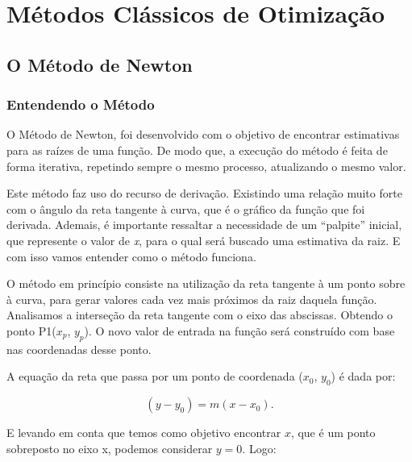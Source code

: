 
\chapter{\Large{Métodos Clássicos de Otimização}}\label{chp:2}


\section{{O Método de Newton}}


\subsection{Entendendo o Método}

\hspace{0.8cm}
O Método de Newton, foi desenvolvido com o objetivo de encontrar estimativas
para as raízes de uma função. De modo que, a execução do método é feita de
forma iterativa, repetindo sempre o mesmo processo, atualizando o mesmo valor.

Este método faz uso do recurso de derivação. Existindo uma relação muito
forte com o ângulo da reta tangente à curva, que é o gráfico da função que
foi derivada. Ademais, é importante ressaltar a necessidade de um ``palpite''
inicial, que represente o valor de \textit{x}, para o qual será buscado uma
estimativa da raiz. E com isso vamos entender como o método funciona.

O método em princípio consiste na utilização da reta tangente à um
ponto sobre à curva, para gerar valores cada vez mais próximos da raiz
daquela função. Analisamos a interseção da reta tangente com o eixo das
abscissas. Obtendo o ponto P1($x_p$, $y_p$). O novo valor de entrada na função
será construído com base nas coordenadas desse ponto.

A equação da reta que passa por um ponto de coordenada ($x_0$, $y_0$) é dada
por:

\begin{equation}
    (y - y_0) = m(x - x_0).
\end{equation}

E levando em conta que temos como objetivo encontrar $x$, que é um ponto
sobreposto no eixo x, podemos considerar $y=0$. Logo:

